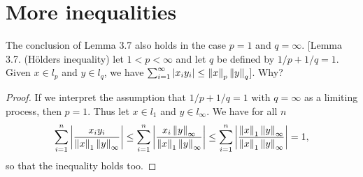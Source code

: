 \section{More inequalities}


\begin{exercise}{24}
The conclusion of Lemma 3.7 also holds in the case $p=1$ and $q=\infty$. [Lemma 3.7. (H\"olders inequality) let $1<p<\infty$ and let $q$ be defined by $1/p+1/q=1$. Given $x\in l_p$ and $y\in l_q$, we have $\sum_{i=1}^\infty \left\lvert x_iy_i\right\rvert\leq\left\lVert x\right\rVert_p\left\lVert y\right\rVert_q$]. Why?
\end{exercise}
\begin{proof}
If we interpret the assumption that $1/p+1/q=1$ with $q=\infty$ as a limiting process, then $p=1$. Thus let $x\in l_1$ and $y\in l_\infty$. We have for all $n$
\[
    \sum^n_{i=1}\left\lvert \frac{x_iy_i}{\left\lVert x\right\rVert_1\left\lVert y\right\rVert_\infty}\right\rvert
    \leq \sum^n_{i=1}\left\lvert \frac{x_i\left\lVert y\right\rVert_\infty}{\left\lVert x\right\rVert_1\left\lVert y\right\rVert_\infty}\right\rvert
    \leq \sum^n_{i=1}\left\lvert \frac{\left\lVert x\right\rVert_1\left\lVert y\right\rVert_\infty}{\left\lVert x\right\rVert_1\left\lVert y\right\rVert_\infty}\right\rvert 
    =1,
\]
so that the inequality holds too.
\end{proof} 

